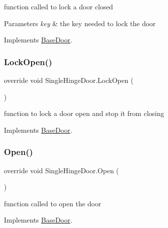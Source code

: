 function called to lock a door closed 


\begin{DoxyParams}{Parameters}
{\em key} & the key needed to lock the door\\
\hline
\end{DoxyParams}


Implements \mbox{\hyperlink{class_base_door_a2b616c52626299f25ac25f7deab44dc4}{Base\+Door}}.

\mbox{\label{class_single_hinge_door_aea7072ec0a9ea4fc80f24dc400681478}} 
\subsubsection{\texorpdfstring{Lock\+Open()}{LockOpen()}}
{\footnotesize\ttfamily override void Single\+Hinge\+Door.\+Lock\+Open (\begin{DoxyParamCaption}{ }\end{DoxyParamCaption})\hspace{0.3cm}{\ttfamily [virtual]}}



function to lock a door open and stop it from closing 



Implements \mbox{\hyperlink{class_base_door_a9a851525c3b6e878bec459992ac75408}{Base\+Door}}.

\mbox{\label{class_single_hinge_door_ad48e670701a9e9d35f97de3b8ff36208}} 
\subsubsection{\texorpdfstring{Open()}{Open()}}
{\footnotesize\ttfamily override void Single\+Hinge\+Door.\+Open (\begin{DoxyParamCaption}{ }\end{DoxyParamCaption})\hspace{0.3cm}{\ttfamily [virtual]}}



function called to open the door 



Implements \mbox{\hyperlink{class_base_door_a418df6f73cc5c56b6989c0512a6a909b}{Base\+Door}}.

